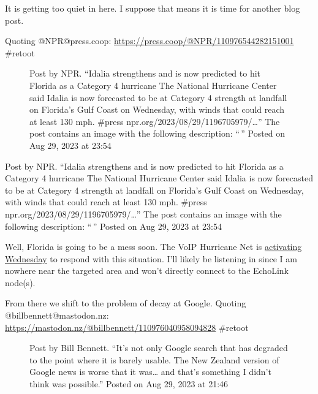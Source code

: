 It is getting too quiet in here. I suppose that means it is time for
another blog post.

Quoting @NPR@press.coop:
\url{https://press.coop/@NPR/110976544282151001} \#retoot

\begin{figure}
\centering
{}
\caption{Post by NPR. ``Idalia strengthens and is now predicted to hit
Florida as a Category 4 hurricane The National Hurricane Center said
Idalia is now forecasted to be at Category 4 strength at landfall on
Florida's Gulf Coast on Wednesday, with winds that could reach at least
130 mph. \#press npr.org/2023/08/29/1196705979/\ldots{}'' The post
contains an image with the following description: ``\,'' Posted on Aug
29, 2023 at 23:54}
\end{figure}

Post by NPR. ``Idalia strengthens and is now predicted to hit Florida as
a Category 4 hurricane The National Hurricane Center said Idalia is now
forecasted to be at Category 4 strength at landfall on Florida's Gulf
Coast on Wednesday, with winds that could reach at least 130 mph.
\#press npr.org/2023/08/29/1196705979/\ldots{}'' The post contains an
image with the following description: ``\,'' Posted on Aug 29, 2023 at
23:54

Well, Florida is going to be a mess soon. The VoIP Hurricane Net is
\href{https://web.archive.org/web/20230830040706/https://voipwx.net/2023/08/29/voip-hurricane-net-will-activate-wednesday-morning-8-30-23-6-am-edt-through-11-pm-edt-for-hurricane-idalia/}{activating
Wednesday} to respond with this situation. I'll likely be listening in
since I am nowhere near the targeted area and won't directly connect to
the EchoLink node(s).

From there we shift to the problem of decay at Google. Quoting
@billbennett@mastodon.nz:
\url{https://mastodon.nz/@billbennett/110976040958094828} \#retoot

\begin{figure}
\centering
{}
\caption{Post by Bill Bennett. ``It's not only Google search that has
degraded to the point where it is barely usable. The New Zealand version
of Google news is worse that it was\ldots{} and that's something I
didn't think was possible.'' Posted on Aug 29, 2023 at 21:46}
\end{figure}

